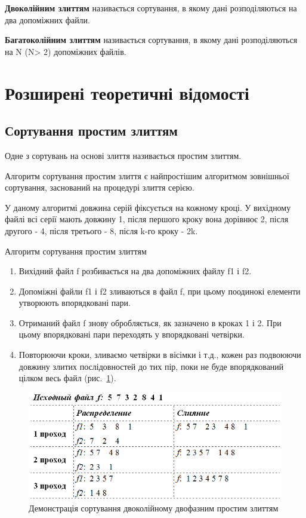 \textbf{Двоколійним злиттям} називається сортування, в якому дані розподіляються на два допоміжних файли. 

\textbf{Багатоколійним злиттям} називається сортування, в якому дані розподіляються на N (N> 2) допоміжних файлів.



\section{Розширені теоретичні відомості}
\nopagebreak[4]

\subsection{Сортування простим злиттям}

Одне з сортувань на основі злиття називається простим злиттям.

Алгоритм сортування простим злиття є найпростішим алгоритмом зовнішньої сортування, заснований на процедурі злиття серією.

У даному алгоритмі довжина серій фіксується на кожному кроці. У вихідному файлі всі серії мають довжину 1, після першого кроку вона дорівнює 2, після другого - 4, після третього - 8, після k-го кроку - 2k.

Алгоритм сортування простим злиттям

\begin{enumerate}
\item Вихідний файл f розбивається на два допоміжних файлу f1 і f2.

\item Допоміжні файли f1 і f2 зливаються в файл f, при цьому поодинокі елементи утворюють впорядковані пари.

\item Отриманий файл f знову обробляється, як зазначено в кроках 1 і 2. При цьому впорядковані пари переходять у впорядковані четвірки.

\item Повторюючи кроки, зливаємо четвірки в вісімки і т.д., кожен раз подвоюючи довжину злитих послідовностей до тих пір, поки не буде впорядкований цілком весь файл (рис.~\ref{f:sort1}).
\end{enumerate}

\begin{figure}
\caption{Демонстрація сортування двоколійному двофазним простим злиттям}\label{f:sort1}
\includegraphics[width=13cm]{pic/43_01.png}

\end{figure}

